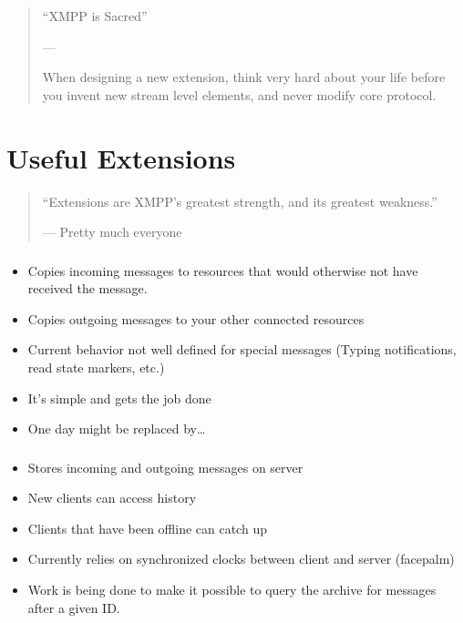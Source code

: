 \documentclass[xelatex,aspectratio=169]{beamer}
\begin{document}
\begin{frame}
\begin{quotation}
``XMPP is Sacred''
\begin{flushright}
---
\end{flushright}
\vspace*{2em}
When designing a new extension, think very hard about your life before you
invent new stream level elements, and never modify core protocol.
\end{quotation}
\end{frame}

\section[]{Useful Extensions}
\frame{\sectionpage}

\begin{frame}
\begin{quotation}
	``Extensions are XMPP's greatest strength, and its greatest weakness.''
	\begin{flushright}
		--- Pretty much everyone
	\end{flushright}
\end{quotation}
\end{frame}

\begin{frame}
	\frametitle{}
	\begin{itemize}
		\item Copies incoming messages to resources that would otherwise not have received the message.
		\item Copies outgoing messages to your other connected resources
		\item Current behavior not well defined for special messages (Typing notifications, read state markers, etc.)
		\item It's simple and gets the job done
		\item One day might be replaced by\ldots
	\end{itemize}
\end{frame}

\begin{frame}
	\frametitle{}
	\begin{itemize}
		\item Stores incoming and outgoing messages on server
		\item New clients can access history
		\item Clients that have been offline can catch up
		\item Currently relies on synchronized clocks between client and server (facepalm)
		\item Work is being done to make it possible to query the archive for
			messages after a given ID.
	\end{itemize}
\end{frame}
\end{document}
